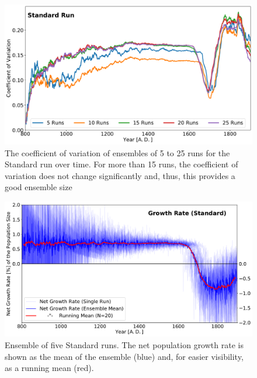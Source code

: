 \begin{figure}[h]
	\centering
	\includegraphics[width=\textwidth]{images/Results/Standard/CoeffOfVariation}
	\caption{The coefficient of variation of ensembles of 5 to 25 runs for the Standard run over time. For more than 15 runs, the coefficient of variation does not change significantly and, thus, this provides a good ensemble size}
	\label{fig:coeffofvariation}
\end{figure}


\begin{figure}[h]
	\centering
	\includegraphics[width=1.0\linewidth]{images/Results/Standard/NetGrowthRate}
	\caption{Ensemble of five Standard runs. The net population growth rate is shown as the mean of the ensemble (blue) and, for easier visibility, as a running mean (red).} 
	\label{fig:app:STDnetgrowthrate}
\end{figure}
\FloatBarrier
